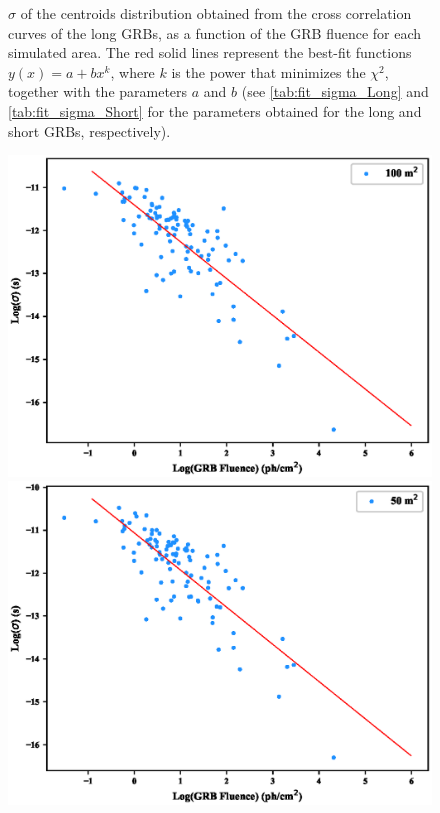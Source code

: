 \documentclass[]{spie}  %
\begin{document}
\begin{figure}[h!]
\caption{$\sigma$ of the centroids distribution obtained from the cross correlation curves of the long GRBs, as a function of the GRB fluence for each simulated area. The red solid lines represent the best-fit functions $y(x)=a+bx^{k}$, where $k$ is the power that minimizes the $\chi^2$, together with the parameters $a$ and $b$  (see \autoref{tab:fit_sigma_Long} and \autoref{tab:fit_sigma_Short} for the parameters obtained for the long and short GRBs, respectively).}
\label{fig:sigma_vs_Fluence_Long}
\end{figure}




\begin{figure}[h!]
\centering
\includegraphics[scale=0.5,angle=0]{fig/SHORT/sigma_vs_fluence_100.eps}
\includegraphics[scale=0.5,angle=0]{fig/SHORT/sigma_vs_fluence_50.eps}\\

\end{figure}
\end{document}
